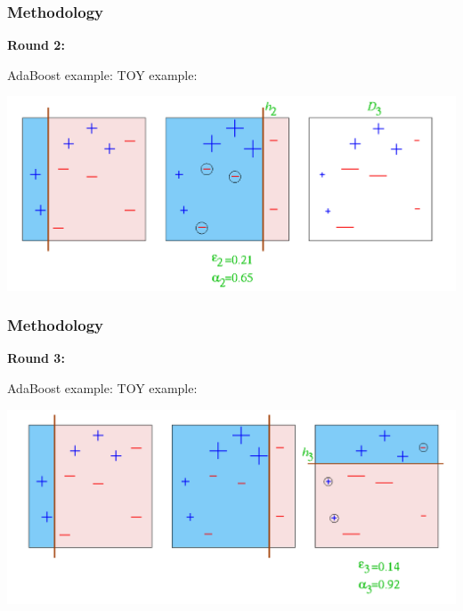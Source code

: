 \documentclass[xcolor={x11names,svgnames,dvipsnames}]{beamer}
\begin{document}
\begin{frame}
	\frametitle{Methodology}
	 \small{\textbf{Round 2:}}\\
		
	\begin{block}{AdaBoost example: TOY example:}

      \includegraphics[width=1\textwidth, height=0.6\textheight]{round_2.png}
	\end{block}	
\end{frame}

\begin{frame}
	\frametitle{Methodology}
			\small{\textbf{Round 3:}}\\
			
	\begin{block}{AdaBoost example: TOY example:}

      \includegraphics[width=1\textwidth, height=0.6\textheight]{round_3.png}
	\end{block}	
\end{frame}
\end{document}
